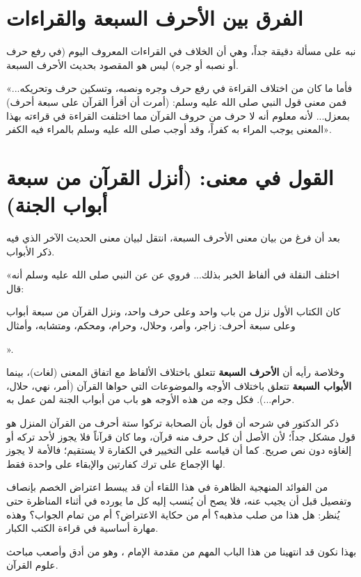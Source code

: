 \section{الفرق بين الأحرف السبعة والقراءات}
نبه  على مسألة دقيقة جداً، وهي أن الخلاف في القراءات المعروف اليوم (في رفع حرف أو نصبه أو جره) ليس هو المقصود بحديث الأحرف السبعة.

 «فأما ما كان من اختلاف القراءة في رفع حرف وجره ونصبه، وتسكين حرف وتحريكه... فمن معنى قول النبي صلى الله عليه وسلم: (أمرت أن أقرأ القرآن على سبعة أحرف) بمعزل... لأنه معلوم أنه لا حرف من حروف القرآن مما اختلفت القراءة في قراءته بهذا المعنى يوجب المراء به كفراً، وقد أوجب صلى الله عليه وسلم بالمراء فيه الكفر».

\section{القول في معنى: (أنزل القرآن من سبعة أبواب الجنة)}
بعد أن فرغ  من بيان معنى الأحرف السبعة، انتقل لبيان معنى الحديث الآخر الذي فيه ذكر الأبواب.

 «اختلف النقلة في ألفاظ الخبر بذلك... فروي عن  عن النبي صلى الله عليه وسلم أنه قال: \begin{hadith}كان الكتاب الأول نزل من باب واحد وعلى حرف واحد، ونزل القرآن من سبعة أبواب وعلى سبعة أحرف: زاجر، وأمر، وحلال، وحرام، ومحكم، ومتشابه، وأمثال\end{hadith}».

وخلاصة رأيه أن \textbf{الأحرف السبعة} تتعلق باختلاف الألفاظ مع اتفاق المعنى (لغات)، بينما \textbf{الأبواب السبعة} تتعلق باختلاف الأوجه والموضوعات التي حواها القرآن (أمر، نهي، حلال، حرام...). فكل وجه من هذه الأوجه هو باب من أبواب الجنة لمن عمل به.

\begin{fawaid}
ذكر الدكتور  في شرحه أن قول  بأن الصحابة تركوا ستة أحرف من القرآن المنزل هو قول مشكل جداً؛ لأن الأصل أن كل حرف منه قرآن، وما كان قرآناً فلا يجوز لأحد تركه أو إلغاؤه دون نص صريح. كما أن قياسه على التخيير في الكفارة لا يستقيم؛ فالأمة لا يجوز لها الإجماع على ترك كفارتين والإبقاء على واحدة فقط.
\end{fawaid}

\begin{fawaid}
من الفوائد المنهجية الظاهرة في هذا اللقاء أن  قد يبسط اعتراض الخصم بإنصاف وتفصيل قبل أن يجيب عنه، فلا يصح أن يُنسب إليه كل ما يورده في أثناء المناظرة حتى يُنظر: هل هذا من صلب مذهبه؟ أم من حكاية الاعتراض؟ أم من تمام الجواب؟ وهذه مهارة أساسية في قراءة الكتب الكبار.
\end{fawaid}

بهذا نكون قد انتهينا من هذا الباب المهم من مقدمة الإمام ، وهو من أدق وأصعب مباحث علوم القرآن.
